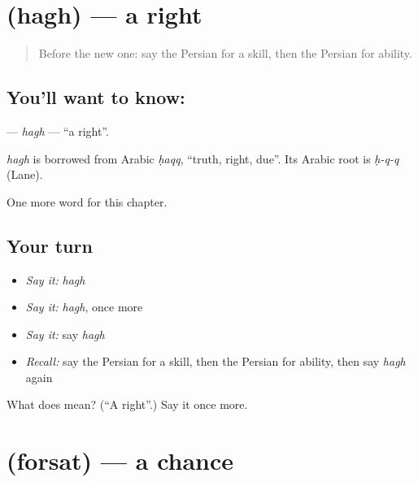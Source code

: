 \section[\texorpdfstring{\fa{حق} (hagh)}{حق (hagh)}]{ (hagh) — a right}

\label{lesson:FA-C89-hagh}



\begin{quote}
Before the new one: say the Persian for a skill, then the Persian for ability.
\end{quote}

\subsection*{You'll want to know: }
\textbf{} — \emph{hagh} — \textquotedblleft{}a right\textquotedblright{}.

\begin{cousinweb}
\emph{hagh} is borrowed from Arabic \emph{ḥaqq}, \textquotedblleft{}truth, right, due\textquotedblright{}. Its Arabic root is \emph{ḥ-q-q} (Lane).
\end{cousinweb}

\begin{grammarlens}[title={What you've built}]
One more word for this chapter.
\end{grammarlens}

\subsection*{Your turn}
\begin{itemize}
\raggedright
  \item \emph{Say it:} \emph{hagh}
  \item \emph{Say it:} \emph{hagh}, once more
  \item \emph{Say it:} say \emph{hagh}
  \item \emph{Recall:} say the Persian for a skill, then the Persian for ability, then say \emph{hagh} again
\end{itemize}

\begin{tcolorbox}[breakable,colback=teal!4,colframe=teal!35!black,title={Before you move on}]
What does  mean? (\textquotedblleft{}A right\textquotedblright{}.) Say it once more.
\end{tcolorbox}
\section[\texorpdfstring{\fa{فرصت} (forsat)}{فرصت (forsat)}]{ (forsat) — a chance}

